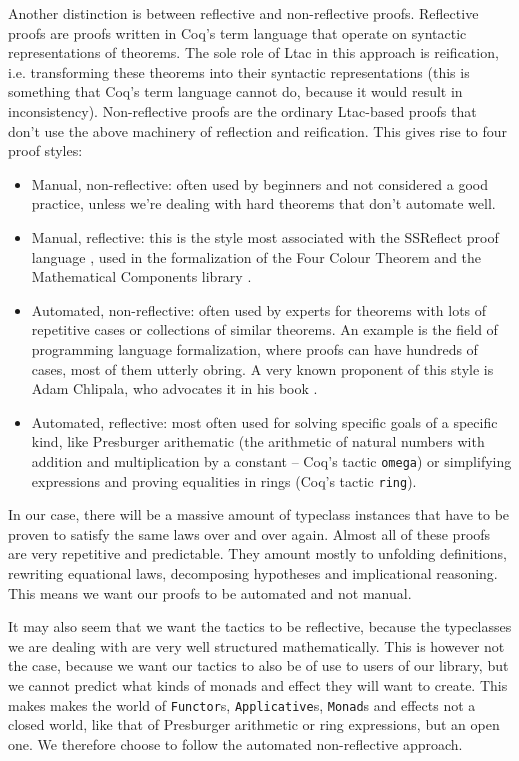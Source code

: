 \documentclass[declaration,inz,english,shortabstract]{iithesis}
\newcommand{\m}[1]{\texttt{#1}}
\begin{document}
Another distinction is between reflective and non-reflective proofs. Reflective proofs are proofs written in Coq's term language that operate on syntactic representations of theorems. The sole role of Ltac in this approach is reification, i.e. transforming these theorems into their syntactic representations (this is something that Coq's term language cannot do, because it would result in inconsistency). Non-reflective proofs are the ordinary Ltac-based proofs that don't use the above machinery of reflection and reification. This gives rise to four proof styles:

\begin{itemize}
    \item Manual, non-reflective: often used by beginners and not considered a good practice, unless we're dealing with hard theorems that don't automate well.
    \item Manual, reflective: this is the style most associated with the SSReflect proof language \cite{SSReflect1} \cite{SSReflect2}, used in the formalization of the Four Colour Theorem \cite{FourColour1} \cite{FourColour2} and the Mathematical Components library \cite{MCB}.
    \item Automated, non-reflective: often used by experts for theorems with lots of repetitive cases or collections of similar theorems. An example is the field of programming language formalization, where proofs can have hundreds of cases, most of them utterly obring. A very known proponent of this style is Adam Chlipala, who advocates it in his book \cite{CPDT}.
    \item Automated, reflective: most often used for solving specific goals of a specific kind, like Presburger arithematic (the arithmetic of natural numbers with addition and multiplication by a constant -- Coq's tactic \m{omega}) or simplifying expressions and proving equalities in rings (Coq's tactic \m{ring}).
\end{itemize}

In our case, there will be a massive amount of typeclass instances that have to be proven to satisfy the same laws over and over again. Almost all of these proofs are very repetitive and predictable. They amount mostly to unfolding definitions, rewriting equational laws, decomposing hypotheses and implicational reasoning. This means we want our proofs to be automated and not manual.

It may also seem that we want the tactics to be reflective, because the typeclasses we are dealing with are very well structured mathematically. This is however not the case, because we want our tactics to also be of use to users of our library, but we cannot predict what kinds of monads and effect they will want to create. This makes makes the world of \m{Functor}s, \m{Applicative}s, \m{Monad}s and effects not a closed world, like that of Presburger arithmetic or ring expressions, but an open one. We therefore choose to follow the automated non-reflective approach.
\end{document}
